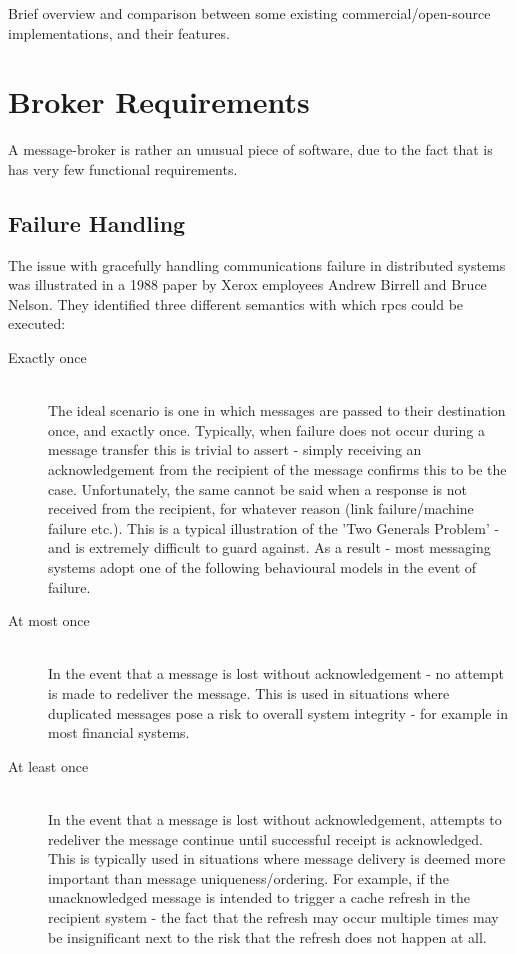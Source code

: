 Brief overview and comparison between some existing commercial/open-source
implementations, and their features.


\section{Broker Requirements}
\label{sec:requirements}

A message-broker is rather an unusual piece of software, due to the fact that is
has very few functional requirements.

\subsection{Failure Handling}
\label{sub:Failure Handling}

The issue with gracefully handling communications failure in distributed systems
was illustrated in a 1988 paper by Xerox employees Andrew Birrell and Bruce
Nelson\cite{Birrell:1988:IRP:59309.59336}. They identified three different
semantics with which \glspl{rpc} could be executed:

\begin{description}
  \item[Exactly once] \hfill \\
    The ideal scenario is one in which messages are passed to their destination
    once, and exactly once. Typically, when failure does not occur during a
    message transfer this is trivial to assert - simply receiving an
    acknowledgement from the recipient of the message confirms this to be the
    case. Unfortunately, the same cannot be said when a response is not received
    from the recipient, for whatever reason (link failure/machine failure etc.).
    This is a typical illustration of the 'Two Generals
    Problem'\cite{Gray:1978:NDB:647433.723863} - and is extremely difficult to
    guard against. As a result - most messaging systems adopt one of the
    following behavioural models in the event of failure.
  \item[At most once] \hfill \\
    In the event that a message is lost without acknowledgement - no attempt is
    made to redeliver the message. This is used in situations where duplicated
    messages pose a risk to overall system integrity - for example in most
    financial systems.
  \item[At least once] \hfill \\
    In the event that a message is lost without acknowledgement, attempts to
    redeliver the message continue until successful receipt is acknowledged.
    This is typically used in situations where message delivery is deemed more
    important than message uniqueness/ordering. For example, if the
    unacknowledged message is intended to trigger a cache refresh in the
    recipient system - the fact that the refresh may occur multiple times may be
    insignificant next to the risk that the refresh does not happen at all.
\end{description}

